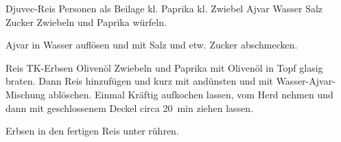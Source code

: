\begin{MyRecipe}{Djuvec-Reis}{ Personen als Beilage}{}
	\ingredient[\Calc{1}{\x}]{} {kl. Paprika}
	\ingredient[\Calc{1}{\x}]{} {kl. Zwiebel}
	\ingredient[\Calc{50}{\x}]{\si{\gram}} {Ajvar}
	\ingredient[\Calc{0.2}{\x}]{\si{\liter}} {Wasser}
	\ingredient[]{} {Salz}
	\ingredient[]{} {Zucker}
	Zwiebeln und Paprika würfeln.
	
	Ajvar in Wasser auflösen und mit Salz und etw. Zucker abschmecken.
	
	\ingredient[\Calc{100}{\x}]{\si{\gram}} {Reis}
	\ingredient[\Calc{50}{\x}]{\si{\gram}} {TK-Erbsen}
	\ingredient[]{} {Olivenöl}
	Zwiebeln und Paprika mit Olivenöl in Topf glasig braten. Dann Reis hinzufügen und kurz mit andünsten und mit Wasser-Ajvar-Mischung ablöschen. Einmal Kräftig aufkochen lassen, vom Herd nehmen und dann mit geschlossenem Deckel circa \SI{20}{\minute} ziehen lassen.
	
	Erbsen in den fertigen Reis unter rühren.
	

	
	
	
\end{MyRecipe}
